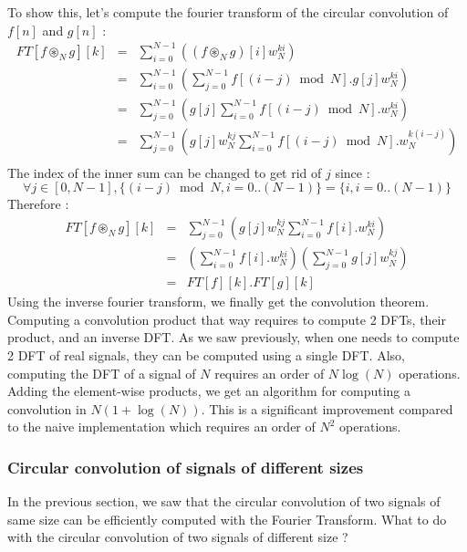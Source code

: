\documentclass[a4paper,10pt,twoside]{article}
\begin{document}
To show this, let's compute the fourier transform of the circular convolution of $f[n]$ and $g[n]$ :
\begin{eqnarray}
FT[ f \circledast_N g ][k] &=& \sum_{i=0}^{N-1} \left( (f \circledast_N g)[i] w_N^{ki} \right)\\
			   &=& \sum_{i=0}^{N-1} \left(\sum_{j=0}^{N-1} f[(i-j) \bmod N].g[j] w_N^{ki}\right)\\
                           &=& \sum_{j=0}^{N-1} \left(g[j] \sum_{i=0}^{N-1} f[(i-j) \bmod N]. w_N^{ki}\right)\\
			   &=& \sum_{j=0}^{N-1} \left(g[j] w_N^{kj} \sum_{i=0}^{N-1} f[(i-j) \bmod N]. w_N^{k(i-j)}\right)\\
\end{eqnarray}
The index of the inner sum can be changed to get rid of $j$ since : 
\begin{equation}
\forall j \in [0,N-1], \{ (i-j) \bmod N, i=0..(N-1)\} = \{ i, i=0..(N-1)\}
\end{equation}
Therefore :
\begin{eqnarray}
FT[ f \circledast_N g ][k] &=& \sum_{j=0}^{N-1} \left(g[j] w_N^{kj} \sum_{i=0}^{N-1} f[i]. w_N^{ki} \right)\\
                           &=& \left( \sum_{i=0}^{N-1} f[i].w_N^{ki}\right) \left(\sum_{j=0}^{N-1} g[j] w_N^{kj}\right)\\
                           &=& FT[f][k] . FT[g][k]
\end{eqnarray}
Using the inverse fourier transform, we finally get the convolution theorem. Computing a convolution product that way requires to compute 2 DFTs, their product, and an inverse DFT. As we saw previously, when one needs to compute 2 DFT of real signals, they can be computed using a single DFT. Also, computing the DFT of a signal of $N$ requires an order of $N \log(N)$ operations. Adding the element-wise products, we get an algorithm for computing a convolution in $N (1+\log(N))$. This is a significant improvement compared to the naive implementation which requires an order of $N^2$ operations.

\subsubsection{Circular convolution of signals of different sizes}

In the previous section, we saw that the circular convolution of two signals of same size can be efficiently computed with the Fourier Transform. What to do with the circular convolution of two signals of different size ?\\
\end{document}
